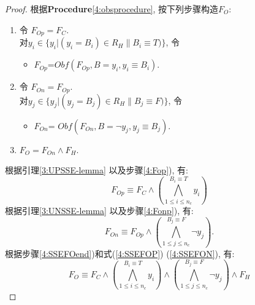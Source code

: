 \begin{proof}

根据\textbf{Procedure}\ref{4:obsprocedure}, 按下列步骤构造$F_O$:
\begin{enumerate}
\item \label{4:Fop}
令 $F_{Op}=F_C$.  \\
对$y_i \in \{y_i|(y_i=B_{i})\in R_H \parallel B_i\equiv T)\}$, 令
\begin{itemize}
 \item[] $F_{Op}$=$Obf(F_{Op},B=y_i,{y_i\equiv B_i})$.
\end{itemize}
\item  \label{4:Fonp}
令 $F_{On}=F_{Op}$. \\
对$y_j \in \{y_j|(y_j=B_j)\in R_H \parallel B_j\equiv F)\}$, 令
\begin{itemize}
 \item[] $F_{On}$= $Obf(F_{On},B=\neg y_j,{y_j\equiv B_j})$.
\end{itemize}
\item  \label{4:SSEFOend}
$F_{O}=F_{On}\wedge F_H$.
\end{enumerate}
根据引理\ref{3:UPSSE-lemma} 以及步骤\ref{4:Fop}), 有:
\begin{equation}\label{4:SSEFOP}
F_{Op} \equiv F_C\wedge (\bigwedge_{1\leqslant i\leqslant n_c}^{B_i \equiv T}y_i)
\end{equation}
根据引理\ref{3:UNSSE-lemma} 以及步骤\ref{4:Fonp}), 有:
\begin{equation}\label{4:SSEFON}
F_{On} \equiv F_{Op}\wedge (\bigwedge_{1\leqslant j\leqslant n_c}^{B_j \equiv F}\neg y_j).
\end{equation}
根据步骤\ref{4:SSEFOend})和式(\ref{4:SSEFOP}) (\ref{4:SSEFON}), 有:
\begin{equation}\label{4:SSEFO}
F_{O} \equiv F_C \wedge
(\bigwedge_{1\leqslant i\leqslant n_c}^{B_i \equiv T}y_i)\wedge
(\bigwedge_{1\leqslant j\leqslant n_c}^{B_j \equiv F}\neg y_j) \wedge F_H
\end{equation}


\end{proof}
